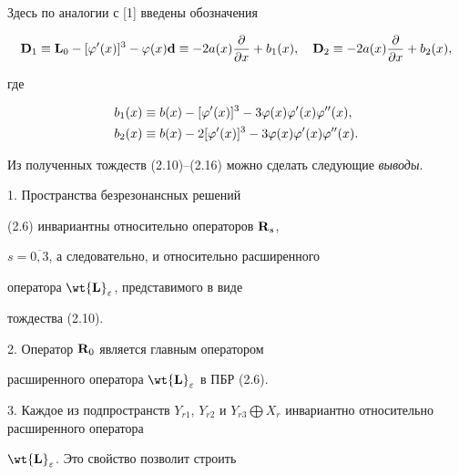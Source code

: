 Здесь по аналогии с [1] введены обозначения


\begin{equation}


\bold{D}_1 \equiv \bold{L}_0 - [{\f ' (x)}]^3 - \f(x) \bold { d }\equiv


-2a(x) \frac{\d}{\d x} + b_1 (x),\quad


\bold{D}_2 \equiv -2 a(x) \frac{\d}{\d x} + b_2 (x),


\end{equation}


где


\begin{equation}


\begin{split}


b_1 (x) &\equiv b(x) - [{\f ' (x)}]^3 - 3 \f(x) \f '(x) \f ''(x), \\


%


b_2 (x) &\equiv b(x) -2 [{\f ' (x)}]^3 - 3 \f(x) \f '(x) \f ''(x).


\end{split}


\end{equation}





Из полученных тождеств (2.10)--(2.16) можно сделать следующие {\it выводы}.





1. Пространства безрезонансных решений


(2.6) инвариантны относительно операторов $\bold{R}_s$,


$s=\overline{0, 3}$, а следовательно, и относительно расширенного


оператора $\wt {\bold L}_{\e}$, представимого в виде


тождества (2.10).





2. Оператор $\bold{R}_0$ является главным оператором


расширенного оператора $\wt {\bold L}_{\e}$ в ПБР (2.6).





3. Каждое из подпространств $Y_{r1}$, $Y_{r2}$ и $Y_{r3}


\bigoplus X_r$ инвариантно относительно расширенного оператора


$\wt{\bold L}_{\e}$. Это свойство позволит строить


